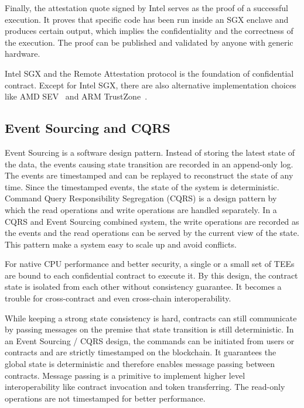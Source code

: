 Finally, the attestation quote signed by Intel serves as the proof of a successful execution. It proves that specific code has been run inside an SGX enclave and produces certain output, which implies the confidentiality and the correctness of the execution. The proof can be published and validated by anyone with generic hardware.

Intel SGX and the Remote Attestation protocol is the foundation of confidential contract. Except for Intel SGX, there are also alternative implementation choices like AMD SEV~\cite{amdsev} and ARM TrustZone~\cite{armtrustzone}.

\subsection{Event Sourcing and CQRS}

Event Sourcing is a software design pattern. Instead of storing the latest state of the data, the events causing state transition are recorded in an append-only log. The events are timestamped and can be replayed to reconstruct the state of any time. Since the timestamped events, the state of the system is deterministic. Command Query Responsibility Segregation (CQRS) is a design pattern by which the read operations and write operations are handled separately. In a CQRS and Event Sourcing combined system, the write operations are recorded as the events and the read operations can be served by the current view of the state. This pattern make a system easy to scale up and avoid conflicts.

For native CPU performance and better security, a single or a small set of TEEs are bound to each confidential contract to execute it. By this design, the contract state is isolated from each other without consistency guarantee. It becomes a trouble for cross-contract and even cross-chain interoperability.

While keeping a strong state consistency is hard, contracts can still communicate by passing messages on the premise that state transition is still deterministic. In an Event Sourcing / CQRS design, the commands can be initiated from users or contracts and are strictly timestamped on the blockchain. It guarantees the global state is deterministic and therefore enables message passing between contracts. Message passing is a primitive to implement higher level interoperability like contract invocation and token transferring. The read-only operations are not timestamped for better performance.

